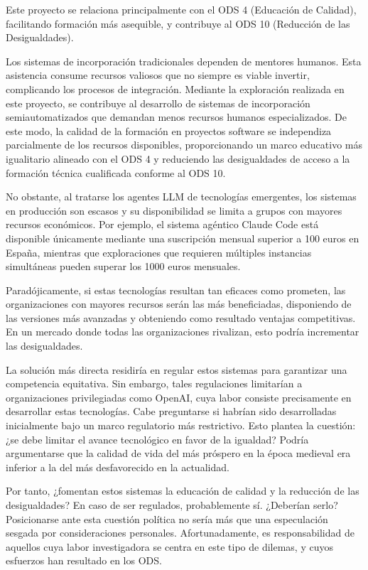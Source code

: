 Este proyecto se relaciona principalmente con el ODS 4 (Educación de Calidad), facilitando formación más asequible, y contribuye al ODS 10 (Reducción de las Desigualdades).

Los sistemas de incorporación tradicionales dependen de mentores humanos. Esta asistencia consume recursos valiosos que no siempre es viable invertir, complicando los procesos de integración. Mediante la exploración realizada en este proyecto, se contribuye al desarrollo de sistemas de incorporación semiautomatizados que demandan menos recursos humanos especializados. De este modo, la calidad de la formación en proyectos software se independiza parcialmente de los recursos disponibles, proporcionando un marco educativo más igualitario alineado con el ODS 4 y reduciendo las desigualdades de acceso a la formación técnica cualificada conforme al ODS 10.

No obstante, al tratarse los agentes LLM de tecnologías emergentes, los sistemas en producción son escasos y su disponibilidad se limita a grupos con mayores recursos económicos. Por ejemplo, el sistema agéntico Claude Code está disponible únicamente mediante una suscripción mensual superior a 100 euros en España, mientras que exploraciones que requieren múltiples instancias simultáneas pueden superar los 1000 euros mensuales.

Paradójicamente, si estas tecnologías resultan tan eficaces como prometen, las organizaciones con mayores recursos serán las más beneficiadas, disponiendo de las versiones más avanzadas y obteniendo como resultado ventajas competitivas. En un mercado donde todas las organizaciones rivalizan, esto podría incrementar las desigualdades.

La solución más directa residiría en regular estos sistemas para garantizar una competencia equitativa. Sin embargo, tales regulaciones limitarían a organizaciones privilegiadas como OpenAI, cuya labor consiste precisamente en desarrollar estas tecnologías. Cabe preguntarse si habrían sido desarrolladas inicialmente bajo un marco regulatorio más restrictivo. Esto plantea la cuestión: ¿se debe limitar el avance tecnológico en favor de la igualdad? Podría argumentarse que la calidad de vida del más próspero en la época medieval era inferior a la del más desfavorecido en la actualidad.

Por tanto, ¿fomentan estos sistemas la educación de calidad y la reducción de las desigualdades? En caso de ser regulados, probablemente sí. ¿Deberían serlo? Posicionarse ante esta cuestión política no sería más que una especulación sesgada por consideraciones personales. Afortunadamente, es responsabilidad de aquellos cuya labor investigadora se centra en este tipo de dilemas, y cuyos esfuerzos han resultado en los ODS.

